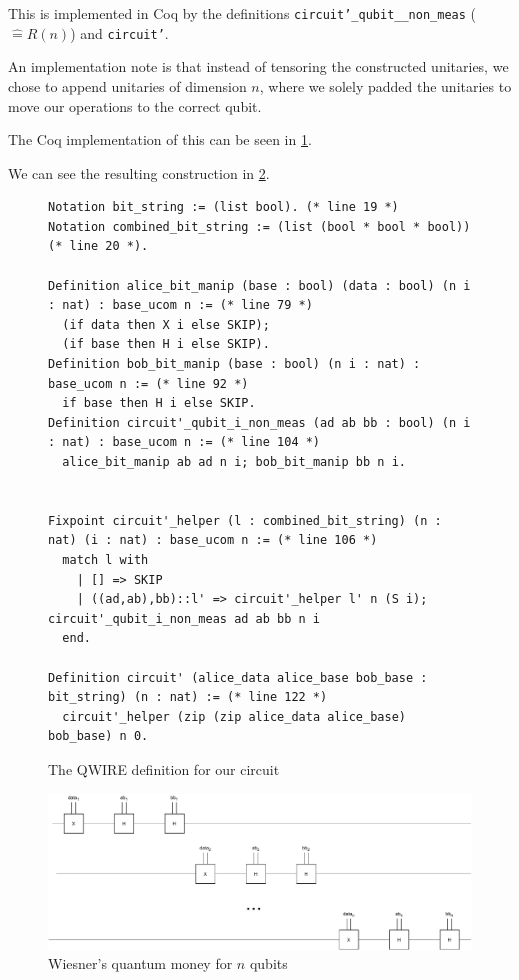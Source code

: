 \documentclass{article}
\begin{document}
This is implemented in Coq by the definitions \texttt{circuit'\_qubit\_\_non\_meas} ($\hat{=} R(n)$) and \texttt{circuit'}.

An implementation note is that instead of tensoring the constructed unitaries, we chose to append unitaries of dimension $n$, where we solely padded the unitaries to move our operations to the correct qubit.

The Coq implementation of this can be seen in \cref{fig:Coq-circuit}.

We can see the resulting construction in \cref{fig:circuit}.
\begin{figure}[h]
    \centering
    \begin{verbatim}
Notation bit_string := (list bool). (* line 19 *)
Notation combined_bit_string := (list (bool * bool * bool)) (* line 20 *). 

Definition alice_bit_manip (base : bool) (data : bool) (n i : nat) : base_ucom n := (* line 79 *)
  (if data then X i else SKIP);
  (if base then H i else SKIP).
Definition bob_bit_manip (base : bool) (n i : nat) : base_ucom n := (* line 92 *)
  if base then H i else SKIP.
Definition circuit'_qubit_i_non_meas (ad ab bb : bool) (n i : nat) : base_ucom n := (* line 104 *)
  alice_bit_manip ab ad n i; bob_bit_manip bb n i.

 
Fixpoint circuit'_helper (l : combined_bit_string) (n : nat) (i : nat) : base_ucom n := (* line 106 *)
  match l with
    | [] => SKIP
    | ((ad,ab),bb)::l' => circuit'_helper l' n (S i); circuit'_qubit_i_non_meas ad ab bb n i
  end.
    
Definition circuit' (alice_data alice_base bob_base : bit_string) (n : nat) := (* line 122 *)
  circuit'_helper (zip (zip alice_data alice_base) bob_base) n 0.
    \end{verbatim}
    \caption{The QWIRE definition for our circuit}
    \label{fig:Coq-circuit}
\end{figure}



\begin{figure}[h]
    \centering
    \includegraphics[width=\textwidth]{res/Wiesner.pdf}
    \caption{Wiesner's quantum money for $n$ qubits}
    \label{fig:circuit}
\end{figure}
\end{document}
